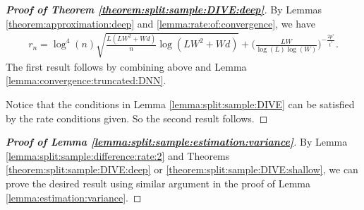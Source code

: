\documentclass[11pt, preprint]{imsart}
\numberwithin{equation}{section}
\theoremstyle{plain}
\theoremstyle{definition}
\begin{document}
\begin{proof}[\bf{Proof of Theorem \ref{theorem:split:sample:DIVE:deep}}]
By Lemmas \ref{theorem:approximation:deep} and \ref{lemma:rate:of:convergence}, we have
\begin{eqnarray}
	r_n=\log^4(n)\sqrt{\frac{L(LW^2+Wd)}{n}\log(LW^2+Wd)}+\bigg(\frac{LW}{\log(L)\log(W)}\bigg)^{-\frac{2p^*}{t^*}}.\nonumber
\end{eqnarray}
The first result follows by combining above and Lemma \ref{lemma:convergence:truncated:DNN}.

Notice that the conditions in Lemma \ref{lemma:split:sample:DIVE} can be satisfied  by the rate conditions given. So the second result follows.
\end{proof}

\begin{proof}[\bf{Proof of Lemma  \ref{lemma:split:sample:estimation:variance}}]
By Lemma \ref{lemma:split:sample:difference:rate:2} and Theorems \ref{theorem:split:sample:DIVE:deep} or   \ref{theorem:split:sample:DIVE:shallow}, we can prove the desired result using similar argument in the proof of Lemma \ref{lemma:estimation:variance}.
\end{proof}
\end{document}
